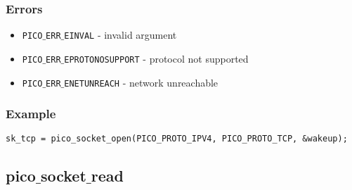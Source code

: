 \subsubsection*{Errors}
\begin{itemize}[noitemsep]
\item \texttt{PICO$\_$ERR$\_$EINVAL} - invalid argument
\item \texttt{PICO$\_$ERR$\_$EPROTONOSUPPORT} - protocol not supported
\item \texttt{PICO$\_$ERR$\_$ENETUNREACH} - network unreachable 
\end{itemize}

\subsubsection*{Example}
\begin{verbatim}
sk_tcp = pico_socket_open(PICO_PROTO_IPV4, PICO_PROTO_TCP, &wakeup);
\end{verbatim}


\subsection{pico$\_$socket$\_$read}

